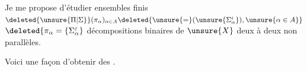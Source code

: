 Je me propose d'étudier  ensembles finis  $\deleted{\unsure{\Pi|\Sigma}}(\pi_\alpha)_{\alpha\in A}\deleted{\unsure{=}(\unsure{\Sigma_\alpha^i}),\unsure{\alpha\in A}}$
$\deleted{\pi_\alpha=\{\Sigma_\alpha^\varepsilon}$  décompositions binaires de $\unsure{X}$ deux à deux non parallèles.

Voici une façon   d'obtenir des .
